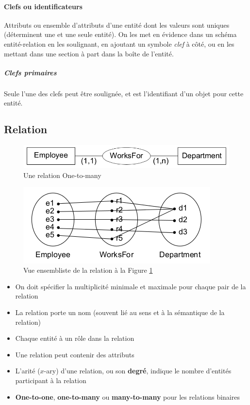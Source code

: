 \documentclass[a4paper]{article}
\begin{document}
\paragraph{Clefs ou identificateurs}
Attributs ou ensemble d'attributs d'une entité dont les valeurs sont uniques
(déterminent une et une seule entité). On les met en évidence dans un schéma
entité-relation en les soulignant, en ajoutant un symbole \textit{clef} à côté,
ou en les mettant dans une section à part dans la boîte de l'entité.
\subparagraph{Clefs primaires}
Seule l'une des clefs peut être soulignée, et est l'identifiant d'un objet pour
cette entité.

\subsection{Relation}
\begin{figure}[h!]
    \center
    \includegraphics[width=.4\textwidth]{fig/relation.png}
    \caption{\label{fig:relation}Une relation One-to-many}
\end{figure}
\begin{figure}[h!]
    \center
    \includegraphics[width=.3\textwidth]{fig/relation-ensembliste.png}
    \caption{Vue ensembliste de la relation à la Figure \ref{fig:relation}}
\end{figure}
\begin{itemize}
  \item On doit spécifier la multiplicité minimale et maximale pour chaque pair de la relation
  \item La relation porte un nom (souvent lié au sens et à la sémantique de la relation)
  \item Chaque entité à un rôle dans la relation
  \item Une relation peut contenir des attributs
  \item L'arité ($x$-ary) d'une relation, ou son \textbf{degré}, indique le nombre d'entités participant à la relation
  \item \textbf{One-to-one}, \textbf{one-to-many} ou \textbf{many-to-many} pour les relations binaires
\end{itemize}
\end{document}
